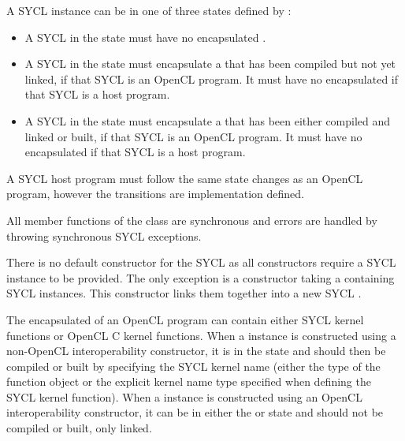 A SYCL  instance can be in one of three states defined by : 
\begin{itemize}
\item A SYCL  in the  state must have no encapsulated .
\item A SYCL  in the  state must encapsulate a  that has been compiled but not yet linked, if that SYCL  is an OpenCL program. It must have no encapsulated  if that SYCL  is a host program.
\item A SYCL  in the  state must encapsulate a  that has been either compiled and linked or built, if that SYCL  is an OpenCL program. It must have no encapsulated  if that SYCL  is a host program.
\end{itemize}

A SYCL  host program must follow the same state changes as an OpenCL program, however the transitions are implementation defined.

All member functions of the  class are synchronous and errors are handled by throwing synchronous SYCL exceptions.

There is no default constructor for the SYCL  as all constructors require a SYCL  instance to be provided. 
The only exception is a constructor taking a  containing SYCL  instances.
This constructor links them together into a new SYCL .

The encapsulated  of an OpenCL program can contain either SYCL kernel functions or OpenCL C kernel functions. When a  instance is constructed using a non-OpenCL interoperability constructor, it is in the  state and should then be compiled or built by specifying the SYCL kernel name (either the type of the function object or the explicit kernel name type specified when defining the SYCL kernel function). When a  instance is constructed using an OpenCL interoperability constructor, it can be in either the  or  state  and should not be compiled or built, only linked.

